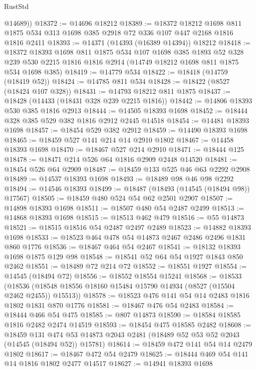 \begin{lexlean}{RustStd}
\begin{coremodule}
        @14689))
@18372 := @14696 @18212
@18389 := @18372
    @18212
    @1698
    @811
    @1875
    @534
    @313
    @1698
    @385
    @2918
    @72
    @336
    @107
    @447
    @2168
    @1816
    @1816
    @2411
@18393 := @14371 (@14393 (@16389 @14394)) @18212
@18418 := @18372
    @18393
    @1698
    @811
    @1875
    @534
    @107
    @1698
    @385
    @1893
    @52
    @328
    @239
    @530
    @2215
    @1816
    @1816
    @2914
    (@14749 @18212 @1698 @811 @1875 @534 @1698 @385)
@18419 := @14779 @534
@18422 := @18418 (@14759 (@18419 @52))
@18424 := @14785 @811 @534
@18428 := @18422 (@8527 (@18424 @107 @328))
@18431 := @14793 @18212 @811 @1875
@18437 := @18428 (@14433 (@18431 @328 @239 @2215 @1816))
@18442 := @14806 @18393 @530 @385 @1816 @2913
@18444 := @14505 @18393 @1698
@18452 := @18444 @328 @385 @529 @382 @1816 @2912 @2445 @14518
@18454 := @14481 @18393 @1698
@18457 := @18454 @529 @382 @2912
@18459 := @14490 @18393 @1698
@18465 := @18459 @527 @141 @214 @14 @2910 @1802
@18467 := @14458 @18393 @1698
@18470 := @18467 @527 @214 @2910
@18471 := @18444 @125
@18478 := @18471 @214 @526 @64 @1816 @2909 @2448 @14520
@18481 := @18454 @526 @64 @2909
@18487 := @18459 @133 @525 @46 @63 @2292 @2908
@18489 := @14537 @18393 @1698
@18493 := @18489 @98 @46 @98 @2292
@18494 := @14546 @18393
@18499 := @18487 (@18493 (@14545 (@18494 @98)) @17567)
@18505 := @18459 @480 @524 @54 @62 @2501 @2907
@18507 := @14898 @18393 @1698
@18511 := @18507 @480 @54 @2487 @2499
@18513 := @14868 @18393 @1698
@18515 := @18513 @462 @479
@18516 := @55 @14873
@18521 := @18515 @18516 @54 @2487 @2497 @2489
@18523 := @14882 @18393 @1698
@18533 := @18523 @464 @478 @54 @14873 @2467 @2486 @2496 @1831 @860 @1776
@18536 := @18467 @464 @54 @2467
@18541 := @18132 @18393 @1698 @1875 @129 @98
@18548 := @18541 @52 @64 @54 @1927 @1843 @850 @2462
@18551 := @18489 @72 @214 @72
@18552 := @18551 @1927
@18554 := @14545 (@18494 @72)
@18556 := @18552 @18554 @15241
@18568 := @18533
    (@18536 (@18548 @18556 @18160 @15484 @15790 @14934 (@8527 (@15504 @2462 @2455)) @15513))
@18578 := @18523 @476 @141 @54 @14 @2483 @1816 @1802 @1831 @870 @1776
@18581 := @18467 @476 @54 @2483
@18584 := @18444 @466 @54 @475
@18585 := @807 @14873
@18590 := @18584 @18585 @1816 @2482 @2474 @14519
@18593 := @18454 @475 @18585 @2482
@18608 := @18459
    @131
    @474
    @53
    @14873
    @2043
    @2481
    (@18489 @52 @53 @52 @2043 (@14545 (@18494 @52)) @15781)
@18614 := @18459 @472 @141 @54 @14 @2479 @1802
@18617 := @18467 @472 @54 @2479
@18625 := @18444 @469 @54 @141 @14 @1816 @1802 @2477 @14517
@18627 := @14941 @18393 @1698

\end{coremodule}
\end{lexlean}
